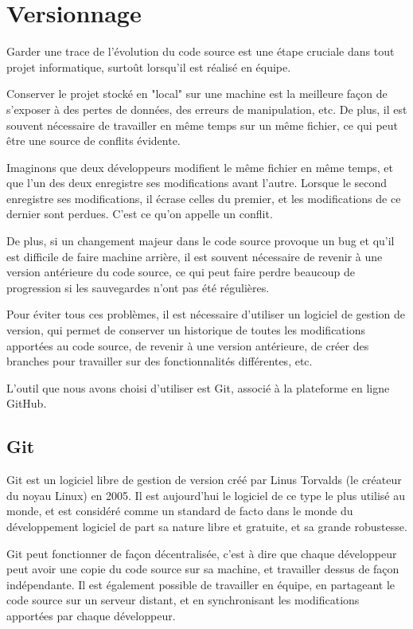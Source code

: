 \documentclass[12pt]{scrreprt} %
\begin{document}
\section{Versionnage}

Garder une trace de l'évolution du code source est une étape cruciale dans tout projet informatique, surtoût lorsqu'il est réalisé en équipe.

Conserver le projet stocké en "local" sur une machine est la meilleure façon de s'exposer à des pertes de données, des erreurs de manipulation, etc. De plus, il est souvent nécessaire de travailler en même temps sur un même fichier, ce qui peut être une source de conflits évidente.

Imaginons que deux développeurs modifient le même fichier en même temps, et que l'un des deux enregistre ses modifications avant l'autre. Lorsque le second enregistre ses modifications, il écrase celles du premier, et les modifications de ce dernier sont perdues. C'est ce qu'on appelle un conflit.

De plus, si un changement majeur dans le code source provoque un bug et qu'il est difficile de faire machine arrière, il est souvent nécessaire de revenir à une version antérieure du code source, ce qui peut faire perdre beaucoup de progression si les sauvegardes n'ont pas été régulières.

Pour éviter tous ces problèmes, il est nécessaire d'utiliser un logiciel de gestion de version, qui permet de conserver un historique de toutes les modifications apportées au code source, de revenir à une version antérieure, de créer des branches pour travailler sur des fonctionnalités différentes, etc.

L'outil que nous avons choisi d'utiliser est Git\cite{Git2024}, associé à la plateforme en ligne GitHub\cite{GitHub2024}.

\subsection{Git}

Git est un logiciel libre de gestion de version créé par Linus Torvalds (le créateur du noyau Linux) en 2005. Il est aujourd'hui le logiciel de ce type le plus utilisé au monde, et est considéré comme un standard de facto dans le monde du développement logiciel de part sa nature libre et gratuite, et sa grande robustesse.

Git peut fonctionner de façon décentralisée, c'est à dire que chaque développeur peut avoir une copie du code source sur sa machine, et travailler dessus de façon indépendante. Il est également possible de travailler en équipe, en partageant le code source sur un serveur distant, et en synchronisant les modifications apportées par chaque développeur.
\end{document}
